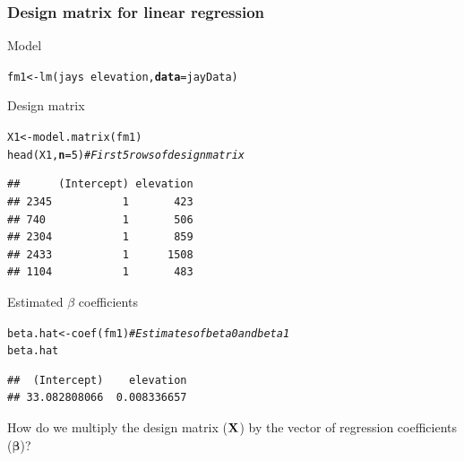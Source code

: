 \documentclass[color=usenames,dvipsnames]{beamer}\usepackage[]{graphicx}\usepackage[]{color}
\makeatletter
\newcommand{\hlnum}[1]{\textcolor[rgb]{0.69,0.494,0}{#1}}%
\newcommand{\hlcom}[1]{\textcolor[rgb]{0.514,0.506,0.514}{\textit{#1}}}%
\newcommand{\hlopt}[1]{\textcolor[rgb]{0,0,0}{#1}}%
\newcommand{\hlstd}[1]{\textcolor[rgb]{0,0,0}{#1}}%
\newcommand{\hlkwb}[1]{\textcolor[rgb]{0,0.341,0.682}{#1}}%
\newcommand{\hlkwc}[1]{\textcolor[rgb]{0,0,0}{\textbf{#1}}}%
\newcommand{\hlkwd}[1]{\textcolor[rgb]{0.004,0.004,0.506}{#1}}%
\newenvironment{kframe}{%
 \def\at@end@of@kframe{}%
 \ifinner\ifhmode%
  \def\at@end@of@kframe{\end{minipage}}%
  \begin{minipage}{\columnwidth}%
 \fi\fi%
 \def\FrameCommand##1{\hskip\@totalleftmargin \hskip-\fboxsep
 \colorbox{shadecolor}{##1}\hskip-\fboxsep
     \hskip-\linewidth \hskip-\@totalleftmargin \hskip\columnwidth}%
 \MakeFramed {\advance\hsize-\width
   \@totalleftmargin\z@ \linewidth\hsize
   \@setminipage}}%
 {\par\unskip\endMakeFramed%
 \at@end@of@kframe}
\newenvironment{knitrout}{}{} %
\makeatother
\begin{document}
\begin{frame}[fragile]
  \frametitle{Design matrix for linear regression}
  \scriptsize %
    {Model}
\begin{knitrout}\scriptsize
{}\color{fgcolor}\begin{kframe}
\begin{alltt}
\hlstd{fm1} \hlkwb{<-} \hlkwd{lm}\hlstd{(jays} \hlopt{~} \hlstd{elevation,} \hlkwc{data}\hlstd{=jayData)}
\end{alltt}
\end{kframe}
\end{knitrout}
    \pause
    \vfill
      {Design matrix}
      \scriptsize %
\begin{knitrout}\scriptsize
{}\color{fgcolor}\begin{kframe}
\begin{alltt}
\hlstd{X1} \hlkwb{<-} \hlkwd{model.matrix}\hlstd{(fm1)}
\hlkwd{head}\hlstd{(X1,} \hlkwc{n}\hlstd{=}\hlnum{5}\hlstd{)} \hlcom{# First 5 rows of design matrix}
\end{alltt}
\begin{verbatim}
##      (Intercept) elevation
## 2345           1       423
## 740            1       506
## 2304           1       859
## 2433           1      1508
## 1104           1       483
\end{verbatim}
\end{kframe}
\end{knitrout}
      {Estimated $\beta$ coefficients}
      \scriptsize %
\begin{knitrout}\scriptsize
{}\color{fgcolor}\begin{kframe}
\begin{alltt}
\hlstd{beta.hat} \hlkwb{<-} \hlkwd{coef}\hlstd{(fm1)} \hlcom{# Estimates of beta0 and beta1}
\hlstd{beta.hat}
\end{alltt}
\begin{verbatim}
##  (Intercept)    elevation 
## 33.082808066  0.008336657
\end{verbatim}
\end{kframe}
\end{knitrout}
  \pause
  \vfill
  {\centering How do we multiply the design matrix ($\bf X$) by
    the vector of regression coefficients ($\bm \beta$)? \\}
\end{frame}
\end{document}
